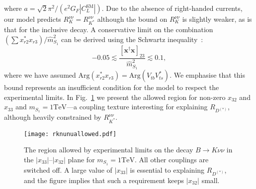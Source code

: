 where $a = \sqrt{2} \pi^2 / (e^2 G_F |C_L^{\text{SM}}|)$. Due to the absence of
right-handed currents, our model predicts $R_K^{\nu\nu} = R_{K^{*}}^{\nu\nu}$
although the bound on $R_{K}^{\nu\nu}$ is slightly weaker, as is that for
the inclusive decay. A conservative limit on the combination
$(\sum x^*_{r 2} x_{r 3})/\hat{m}^2_{S_{1}}$ can be derived using the Schwartz
inequality~\cite{Bauer:2015knc}:
\begin{equation} \label{eq:ch3-bnunucond}
  -0.05 \lesssim \frac{[\mathbf{x}^\dagger \mathbf{x}]_{23}}{\hat{m}^2_{S_{1}}} \lesssim 0.1,
\end{equation}
where we have assumed $\text{Arg}(x_{r2}^*x_{r3}) = \text{Arg}(V_{tb}V_{ts}^*)$.
We emphasise that this bound represents an insufficient condition for the model
to respect the experimental limits. In Fig.~\ref{fig:ch3-rknunuallowed} we present
the allowed region for non-zero $x_{32}$ and $x_{33}$ and $m_{S_{1}} = 1 \text{
  TeV}$---a coupling texture interesting for explaining $R_{D^{(*)}}$, although
heavily constrained by $R_{K^{*}}^{\nu\nu}$.

\begin{figure}[t]
  \centering \texttt{[image: rknunuallowed.pdf]}
  \caption[The region allowed by experimental limits on the decay
  $B \to K^{*} \nu \nu$ in the $|x_{33}|$--$|x_{32}|$ plane for $m_{S_{1}} = 1 \text{
    TeV}$.]{The region allowed by experimental limits on the decay
    $B \to K \nu \nu$ in the $|x_{33}|$--$|x_{32}|$ plane for $m_{S_{1}} = 1 \text{
      TeV}$. All other couplings are switched off. A large value of $|x_{33}|$
    is essential to explaining $R_{D^{(*)}}$, and the figure implies that such a
    requirement keeps $|x_{32}|$ small.}
  \label{fig:ch3-rknunuallowed}
\end{figure}

